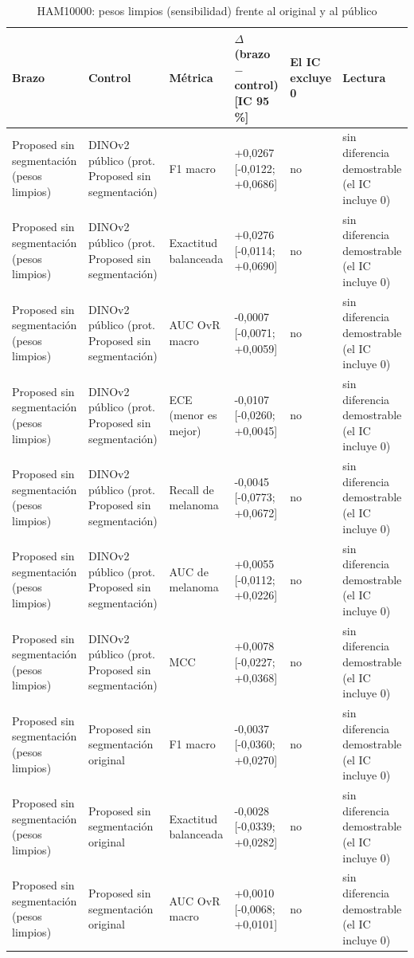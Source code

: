 \begingroup\scriptsize
\begin{longtable}{@{}llllll@{}}
\caption{HAM10000: pesos limpios (sensibilidad) frente al original y al público}\label{tab:ablation-ham-clean} \\
\toprule
Brazo & Control & Métrica & $\Delta$ (brazo $-$ control) [IC 95 \%] & El IC excluye 0 & Lectura \\
\midrule
Proposed sin segmentación (pesos limpios) & DINOv2 público (prot. Proposed sin segmentación) & F1 macro & +0,0267 [-0,0122; +0,0686] & no & sin diferencia demostrable (el IC incluye 0) \\
Proposed sin segmentación (pesos limpios) & DINOv2 público (prot. Proposed sin segmentación) & Exactitud balanceada & +0,0276 [-0,0114; +0,0690] & no & sin diferencia demostrable (el IC incluye 0) \\
Proposed sin segmentación (pesos limpios) & DINOv2 público (prot. Proposed sin segmentación) & AUC OvR macro & -0,0007 [-0,0071; +0,0059] & no & sin diferencia demostrable (el IC incluye 0) \\
Proposed sin segmentación (pesos limpios) & DINOv2 público (prot. Proposed sin segmentación) & ECE (menor es mejor) & -0,0107 [-0,0260; +0,0045] & no & sin diferencia demostrable (el IC incluye 0) \\
Proposed sin segmentación (pesos limpios) & DINOv2 público (prot. Proposed sin segmentación) & Recall de melanoma & -0,0045 [-0,0773; +0,0672] & no & sin diferencia demostrable (el IC incluye 0) \\
Proposed sin segmentación (pesos limpios) & DINOv2 público (prot. Proposed sin segmentación) & AUC de melanoma & +0,0055 [-0,0112; +0,0226] & no & sin diferencia demostrable (el IC incluye 0) \\
Proposed sin segmentación (pesos limpios) & DINOv2 público (prot. Proposed sin segmentación) & MCC & +0,0078 [-0,0227; +0,0368] & no & sin diferencia demostrable (el IC incluye 0) \\
Proposed sin segmentación (pesos limpios) & Proposed sin segmentación original & F1 macro & -0,0037 [-0,0360; +0,0270] & no & sin diferencia demostrable (el IC incluye 0) \\
Proposed sin segmentación (pesos limpios) & Proposed sin segmentación original & Exactitud balanceada & -0,0028 [-0,0339; +0,0282] & no & sin diferencia demostrable (el IC incluye 0) \\
Proposed sin segmentación (pesos limpios) & Proposed sin segmentación original & AUC OvR macro & +0,0010 [-0,0068; +0,0101] & no & sin diferencia demostrable (el IC incluye 0) \\

\end{longtable}
